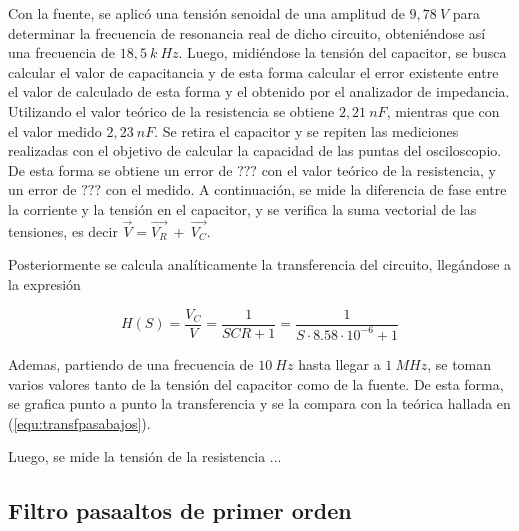 \documentclass[a4paper]{article}
\begin{document}
Con la fuente, se aplicó una tensión senoidal de una amplitud de $9,78 \ V$ para determinar la frecuencia de resonancia real de dicho circuito, obteniéndose así una frecuencia de $18,5 \ k\ Hz$. Luego, midiéndose la tensión del capacitor, se busca calcular el valor de capacitancia y de esta forma calcular el error existente entre el valor de calculado de esta forma y el obtenido por el analizador de impedancia. Utilizando el valor teórico de la resistencia se obtiene $2,21  \ nF  $, mientras que con el valor medido $2,23  \ nF  $. Se retira el capacitor y se repiten las mediciones realizadas con el objetivo de calcular la capacidad de las puntas del osciloscopio. De esta forma se obtiene un error de $ ???  $ con el valor teórico de la resistencia, y un error de $  ???  $ con el medido.
A continuación, se mide la diferencia de fase entre la corriente y la tensión en el capacitor, y se verifica la suma vectorial de las tensiones, es decir $ \overrightarrow{V} = \overrightarrow{V_R} \ + \ \overrightarrow{V_C} $.


Posteriormente se calcula analíticamente la transferencia del circuito, llegándose a la expresión

\begin{equation}
	H \left(S \right) = \frac{V_C}{V} = \frac{1}{SCR + 1} = \frac{1}{S \cdot 8.58 \cdot 10^{-6} + 1}
	\label{equ:transfpasabajos}
\end{equation}

Ademas, partiendo de una frecuencia de $ 10 \ Hz $ hasta llegar a $ 1 \ MHz $, se toman varios valores tanto de la tensión del capacitor como de la fuente. De esta forma, se grafica punto a punto la transferencia y se la compara con la teórica hallada en (\ref{equ:transfpasabajos}).


Luego, se mide la tensión de la resistencia ...

\subsection*{Filtro pasaaltos de primer orden}
\end{document}
